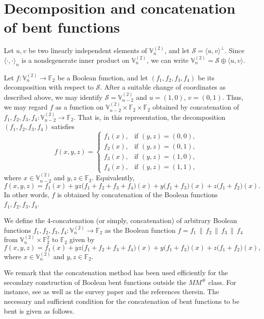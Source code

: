 \documentclass[12pt]{article}
\theoremstyle{plain}
\theoremstyle{definition}
\newcommand{\V}{\mathbb{V}}
\renewcommand{\to}{\rightarrow}
\begin{document}
	
	\section{Decomposition and concatenation of bent functions}
	\label{concat}
	
	Let $u, v$ be two linearly independent elements of $\V_n^{(2)}$, and let 
	$\mathcal{S} = \langle u, v \rangle^{\perp}$. 
	Since $\langle \cdot , \cdot \rangle_n$ is a nondegenerate inner product on 
	$\V_n^{(2)}$, we can write 
	$\V_n^{(2)} = \mathcal{S} \oplus \langle u, v \rangle$. 
	
	
	Let $f \colon \V_n^{(2)} \to \mathbb{F}_2$ be a Boolean function, and
	let $(f_1,f_2,f_3,f_4)$ be its decomposition with respect to
	$\mathcal{S}$. After a suitable change of coordinates as described
	above, we may identify $\mathcal{S}=\V_{n-2}^{(2)}$ and $u=(1,0)$, $v=(0,1)$.
	Thus, we may regard $f$ as a function on
	$\V_{n-2}^{(2)} \times \mathbb{F}_2 \times \mathbb{F}_2$ obtained by
	concatenation of $f_1, f_2, f_3, f_4 \colon \V_{n-2}^{(2)} \to \mathbb{F}_2$.
	That is, in this representation, the decomposition $(f_1,f_2,f_3,f_4)$
	satisfies
	\[
	f(x,y,z)=
	\begin{cases}
	f_1(x), & \text{if } (y,z)=(0,0),\\
	f_2(x), & \text{if } (y,z)=(0,1),\\
	f_3(x), & \text{if } (y,z)=(1,0),\\
	f_4(x), & \text{if } (y,z)=(1,1), 
	\end{cases}
	\]
	where $x\in\V_{n-2}^{(2)}$ and $y,z\in\mathbb{F}_2$.
	Equivalently,
	\[
	f(x,y,z)
	= f_1(x)
	+ yz \bigl(f_1 + f_2 + f_3 + f_4\bigr)(x)
	+ y \bigl(f_1 + f_3\bigr)(x)
	+ z \bigl(f_1 + f_2\bigr)(x).
	\]
	In other words, $f$ is obtained by concatenation of the Boolean functions
	$f_1, f_2, f_3, f_4 $.
	
	We define the $4$-concatenation (or simply, concatenation) of arbitrary Boolean functions
	$f_1, f_2, f_3, f_4 \colon \V_n^{(2)} \to \mathbb{F}_2$ as the Boolean
	function $f = f_1 \,\|\, f_2 \,\|\, f_3 \,\|\, f_4$ from
	$\V_n^{(2)} \times \mathbb{F}_2^2$ to $\mathbb{F}_2$ given by
	\[
	f(x,y,z)
	= f_1(x)
	+ yz \bigl(f_1 + f_2 + f_3 + f_4\bigr)(x)
	+ y \bigl(f_1 + f_3\bigr)(x)
	+ z \bigl(f_1 + f_2\bigr)(x),
	\]
	where $x \in \V_n^{(2)}$ and $y,z \in \mathbb{F}_2$. 
	
	We remark that the concatenation method has been used efficiently for
	the secondary construction of Boolean bent functions outside the \(MM^{\#}\) class. For instance, see
	\cite{Kudin25,PaPoKuZ,PasalicEtAl2023} as well as the survey paper
	\cite{Pasalic26} and the references therein.
	The necessary and sufficient condition for the concatenation of bent
	functions to be bent is given as follows.
\end{document}
